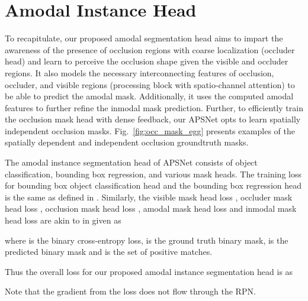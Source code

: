 \documentclass[10pt,twocolumn,letterpaper]{article}
\newcommand{\figref}[1]{Fig.~\ref{#1}}
\begin{document}
\section{Amodal Instance Head}
\label{sec:supp_amodal}

To recapitulate, our proposed amodal segmentation head aims to impart the awareness of the presence of occlusion regions with coarse localization (occluder head) and learn to perceive the occlusion shape given the visible and occluder regions. It also models the necessary interconnecting features of occlusion, occluder, and visible regions (processing block with spatio-channel attention) to be able to predict the amodal mask. Additionally, it uses the computed amodal features to further refine the inmodal mask prediction. Further, to efficiently train the occlusion mask head with dense feedback, our APSNet opts to learn spatially independent occlusion masks. \figref{fig:occ_mask_egg} presents examples of the spatially dependent and independent occlusion groundtruth masks.

The amodal instance segmentation head of APSNet consists of object classification, bounding box regression, and various mask heads.  
The training loss for bounding box object classification head  and the bounding box regression head  is the same as defined in \cite{mohan2020efficientps}. Similarly, the visible mask head loss , occluder mask head loss , occlusion mask head loss , amodal mask head loss  and inmodal mask head loss  are akin to  in \cite{mohan2020efficientps} given as

where  is the binary cross-entropy loss,  is the ground truth binary mask,  is the predicted binary mask and  is the set of positive matches.

Thus the overall loss for our proposed amodal instance segmentation head is as


Note that the gradient from the loss  does not flow through the RPN.
\end{document}
